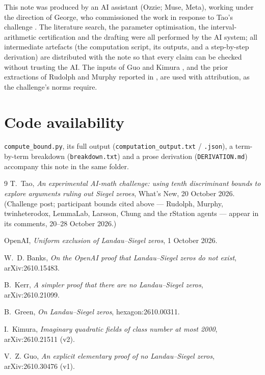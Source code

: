 \documentclass[11pt]{article}
\begin{document}
This note was produced by an AI assistant (Ozzie; Muse, Meta),
working under the direction of George, who commissioned the work in
response to Tao's challenge \cite{tao}. The literature search, the
parameter optimisation, the interval-arithmetic certification and the
drafting were all performed by the AI system; all intermediate artefacts
(the computation script, its outputs, and a step-by-step derivation) are
distributed with the note so that every claim can be checked without
trusting the AI. The inputs of Guo \cite{guo} and Kimura \cite{kimura},
and the prior extractions of Rudolph and Murphy reported in \cite{tao},
are used with attribution, as the challenge's norms require.

\section*{Code availability}

\texttt{compute\_bound.py}, its full output
(\texttt{computation\_output.txt} / \texttt{.json}), a term-by-term
breakdown (\texttt{breakdown.txt}) and a prose derivation
(\texttt{DERIVATION.md}) accompany this note in the same folder.

\begin{thebibliography}{9}
 T.~Tao, \emph{An experimental AI-math challenge: using
tenth discriminant bounds to explore arguments ruling out Siegel zeroes},
What's New, 20 October 2026. (Challenge post; participant bounds cited
above --- Rudolph, Murphy, twinheterodox, LemmaLab, Larsson, Chung and
the rStation agents --- appear in its comments, 20--28 October 2026.)

 OpenAI, \emph{Uniform exclusion of Landau--Siegel
zeros}, 1 October 2026.

 W.~D. Banks, \emph{On the OpenAI proof that
Landau--Siegel zeros do not exist}, arXiv:2610.15483.

 B.~Kerr, \emph{A simpler proof that there are no
Landau--Siegel zeros}, arXiv:2610.21099.

 B.~Green, \emph{On Landau--Siegel zeros},
hexagon:2610.00311.

 I.~Kimura, \emph{Imaginary quadratic fields of class
number at most 2000}, arXiv:2610.21511 (v2).

 V.~Z. Guo, \emph{An explicit elementary proof of no
Landau--Siegel zeros}, arXiv:2610.30476 (v1).
\end{thebibliography}
\end{document}
